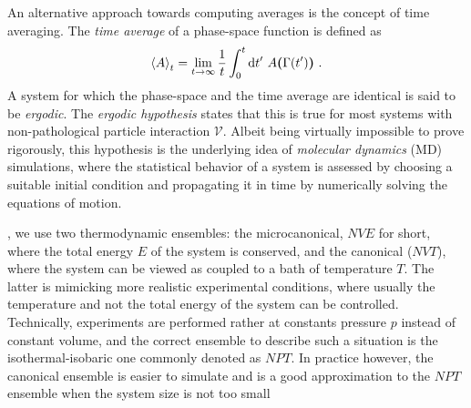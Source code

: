 An alternative approach towards computing averages is the concept of time averaging. The \emph{time average} of a phase-space function is defined as
\begin{align}
  \braket{A}_t
    = \lim\limits_{t \to \infty} \frac{1}{t} \int_0^t \d t' ~ A {\bm (} \Gamma(t') {\bm )}~.
  \label{eq:time.average}
\end{align}
A system for which the phase-space and the time average are identical is said to be \emph{ergodic}. The \emph{ergodic hypothesis} states that this is true for most systems with non-pathological particle interaction $\mathcal V$. Albeit being virtually impossible to prove rigorously, this hypothesis is the underlying idea of \emph{molecular dynamics} (MD) simulations, where the statistical behavior of a system is assessed by choosing a suitable initial condition and propagating it in time by numerically solving the equations of motion.

, we use two thermodynamic ensembles: the microcanonical, $NVE$ for short, where the total energy $E$ of the system is conserved, and the canonical ($NVT$), where the system can be viewed as coupled to a bath of temperature $T$. The latter is mimicking more realistic experimental conditions, where usually the temperature and not the total energy of the system can be controlled. Technically, experiments are performed rather at constants pressure $p$ instead of constant volume, and the correct ensemble to describe such a situation is the isothermal-isobaric one commonly denoted as $NPT$. In practice however, the canonical ensemble is easier to simulate and is a good approximation to the $NPT$ ensemble when the system size is not too small~\cite[p.\,134]{Tuckerman}



